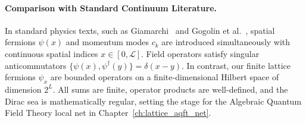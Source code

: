 \paragraph{Comparison with Standard Continuum Literature.}
In standard physics texts, such as Giamarchi~\cite{giamarchi2004} and Gogolin et al.~\cite{gogolin1998}, spatial fermions $\psi(x)$ and momentum modes $c_k$ are introduced simultaneously with continuous spatial indices $x \in [0, \mathcal{L}]$. Field operators satisfy singular anticommutators $\{\psi(x), \psi^\dagger(y)\} = \delta(x-y)$. In contrast, our finite lattice fermions $\psi_x$ are bounded operators on a finite-dimensional Hilbert space of dimension $2^L$. All sums are finite, operator products are well-defined, and the Dirac sea is mathematically regular, setting the stage for the Algebraic Quantum Field Theory local net in Chapter~\ref{ch:lattice_aqft_net}.
